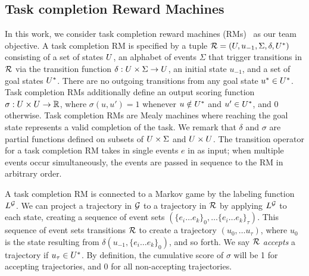 \subsection{Task completion Reward Machines} 
In this work, we consider task completion reward machines (RMs)~\cite{xu2020joint, neary2020reward, smith2023automatic} as our team objective. A task completion RM is specified by a tuple $\mathcal{R} = (U, u_{-1}, \Sigma, \delta, U^*)$ consisting of a set of states $U$, an alphabet of events $\Sigma$ that trigger transitions in $\mathcal{R}$ via the transition function $\delta: U \times \Sigma \rightarrow U$, an initial state $u_{-1}$, and a set of goal states $U^*$. There are no outgoing transitions from any goal state $u^* \in U^*$. Task completion RMs additionally define an output scoring function $\sigma: U \times U \rightarrow \mathbb{R}$, where $\sigma(u, u') = 1$ whenever $u \notin U^*$ and $u' \in U^*$, and $0$ otherwise. Task completion RMs are Mealy machines \cite{mealy1955method} where reaching the goal state represents a valid completion of the task. We remark that $\delta$ and $\sigma$ are partial functions defined on subsets of $U \times \Sigma$ and $U \times U$.
The transition operator for a task completion RM takes in single events $e$ in as input; when multiple events occur simultaneously, the events are passed in sequence to the RM in arbitrary order. %

A task completion RM is connected to a Markov game by the labeling function $L^{\mathcal{G}}$. We can project a trajectory in $\mathcal{G}$ to a trajectory in $\mathcal{R}$ by applying $L^{\mathcal{G}}$ to each state, creating a sequence of event sets $(\{e_i \dots e_k\}_0, \dots \{e_i \dots e_k\}_\tau)$. This sequence of event sets transitions $\mathcal{R}$ to create a trajectory $(u_0, \dots u_{\tau})$, where $u_0$ is the state resulting from $\delta(u_{-1}, \{e_i \dots e_k\}_0)$, and so forth. We say $\mathcal{R}$ \textit{accepts} a trajectory if  $u_{\tau} \in U^*$. By definition, the cumulative score of $\sigma$ will be 1 for accepting trajectories, and 0 for all non-accepting trajectories.


